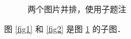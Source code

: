 \documentclass[fonset = fandol]{ctexart}
\begin{document}
\begin{figure}
	\centering
	\hfill
	\caption{两个图片并排，使用子题注} \label{fig3}
\end{figure}
图 \ref{fig1} 和 \ref{fig2} 是图 \ref{fig3} 的子图．
\end{document}

